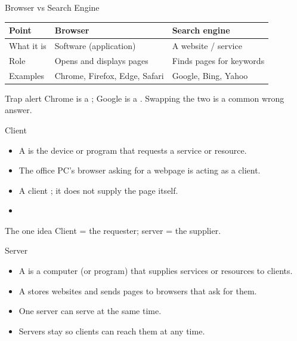 \documentclass[aspectratio=169]{beamer}
\begin{document}
\begin{frame}{Browser vs Search Engine}
  \begin{center}
    \begin{tabular}{lll}
      \toprule
      \textbf{Point} & \textbf{Browser} & \textbf{Search engine} \\
      \midrule
      What it is & Software (application) & A website / service \\
      Role & Opens and displays pages & Finds pages for keywords \\
      Examples & Chrome, Firefox, Edge, Safari & Google, Bing, Yahoo \\
      \bottomrule
    \end{tabular}
  \end{center}
  \vspace{0.35cm}
  \begin{alertblock}{Trap alert}
    Chrome is a ; Google is a . Swapping the
    two is a common wrong answer.
  \end{alertblock}
\end{frame}

\begin{frame}{Client}
  \begin{itemize}
    \item A  is the device or program that requests a service or
      resource.
    \item The office PC's browser asking for a webpage is acting as a client.
    \item A client ; it does not supply the page itself.
    \item {}
  \end{itemize}
  \begin{block}{The one idea}
    Client = the requester; server = the supplier.
  \end{block}
\end{frame}

\begin{frame}{Server}
  \begin{itemize}
    \item A  is a computer (or program) that supplies services or
      resources to clients.
    \item A  stores websites and sends pages to browsers that
      ask for them.
    \item One server can serve  at the same time.
    \item Servers stay  so clients can reach
      them at any time.
  \end{itemize}
\end{frame}
\end{document}
